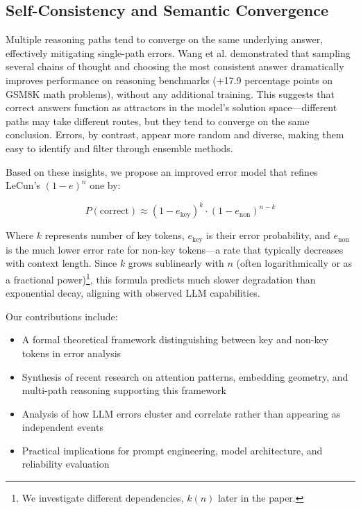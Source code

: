 \documentclass{article}
\begin{document}
\subsection{Self-Consistency and Semantic Convergence}

Multiple reasoning paths tend to converge on the same underlying answer, effectively mitigating single-path errors. Wang et al. \citep{wang2023self} demonstrated that sampling several chains of thought and choosing the most consistent answer dramatically improves performance on reasoning benchmarks (+17.9 percentage points on GSM8K math problems), without any additional training. This suggests that correct answers function as attractors in the model's solution space—different paths may take different routes, but they tend to converge on the same conclusion. Errors, by contrast, appear more random and diverse, making them easy to identify and filter through ensemble methods.

Based on these insights, we propose an improved error model that refines LeCun's $(1-e)^n$ one by:

\begin{equation}
P(\text{correct}) \approx (1-e_{\text{key}})^k \cdot (1-e_{\text{non}})^{n-k}
\end{equation}

Where $k$ represents number of key tokens, $e_{\text{key}}$ is their error probability, and $e_{\text{non}}$ is the much lower error rate for non-key tokens—a rate that typically decreases with context length. Since $k$ grows sublinearly with $n$ (often logarithmically or as a fractional power)\footnote{We investigate different dependencies, $k(n)$ later in the paper.}, this formula predicts much slower degradation than exponential decay, aligning with observed LLM capabilities. 

Our contributions include:
\begin{itemize}
\item A formal theoretical framework distinguishing between key and non-key tokens in error analysis
\item Synthesis of recent research on attention patterns, embedding geometry, and multi-path reasoning supporting this framework
\item Analysis of how LLM errors cluster and correlate rather than appearing as independent events
\item Practical implications for prompt engineering, model architecture, and reliability evaluation
\end{itemize}
\end{document}

